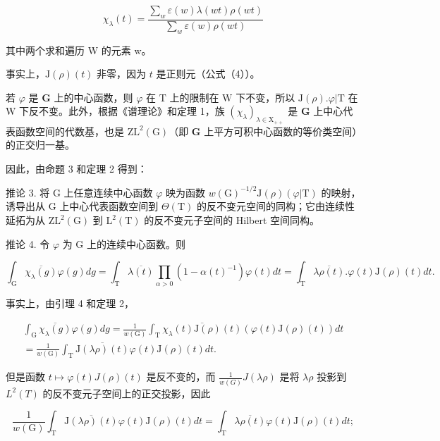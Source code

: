 \[
\chi_ {\lambda} (t) = \frac {\sum_ {w} \varepsilon (w) \lambda (w t) \rho (w t)}{\sum_ {w} \varepsilon (w) \rho (w t)}\tag{5}
\]

其中两个求和遍历 W 的元素 w。

事实上，\(\mathrm{J}(\rho)(t)\) 非零，因为 \(t\) 是正则元（公式（4））。

若 \(\varphi\) 是 \(\mathbf{G}\) 上的中心函数，则 \(\varphi\) 在 \(\mathrm{T}\) 上的限制在 \(\mathrm{W}\) 下不变，所以 \(\mathrm{J}(\rho). \varphi|\mathrm{T}\) 在 \(\mathrm{W}\) 下反不变。此外，根据《谱理论》和定理 1，族 \((\chi_{\lambda})_{\lambda \in \mathrm{X}_{++}}\) 是 \(\mathbf{G}\) 上中心代表函数空间的代数基，也是 \(\mathrm{ZL}^2(\mathrm{G})\)（即 \(\mathbf{G}\) 上平方可积中心函数的等价类空间）的正交归一基。

因此，由命题 3 和定理 2 得到：

推论 3. 将 G 上任意连续中心函数 \(\varphi\) 映为函数 \(w(\mathrm{G})^{-1/2}\mathrm{J}(\rho)(\varphi|\mathrm{T})\) 的映射，诱导出从 G 上中心代表函数空间到 \(\Theta(\mathrm{T})\) 的反不变元空间的同构；它由连续性延拓为从 \(\mathrm{ZL}^2(\mathrm{G})\) 到 \(\mathrm{L}^2(\mathrm{T})\) 的反不变元子空间的 Hilbert 空间同构。

推论 4. 令 \(\varphi\) 为 G 上的连续中心函数。则

\[
\int_ {\mathrm{G}} \overline {{\chi_ {\lambda} (g)}} \varphi (g) d g = \int_ {\mathrm{T}} \overline {{\lambda (t)}} \prod_ {\alpha > 0} (1 - \alpha (t) ^ {- 1}) \varphi (t) d t = \int_ {\mathrm{T}} \overline {{\lambda \rho (t)}}. \varphi (t) \mathrm{J} (\rho) (t) d t.
\]

事实上，由引理 4 和定理 2，

\[
\begin{array}{c} \int_ {\mathrm{G}} \overline {{\chi_ {\lambda} (g)}} \varphi (g) d g = \frac {1}{w (\mathrm{G})} \int_ {\mathrm{T}} \overline {{\chi_ {\lambda} (t) \mathrm{J} (\rho) (t)}} (\varphi (t) \mathrm{J} (\rho) (t)) d t \\ = \frac {1}{w (\mathrm{G})} \int_ {\mathrm{T}} \overline {{\mathrm{J} (\lambda \rho) (t)}} \varphi (t) \mathrm{J} (\rho) (t) d t. \end{array}
\]

但是函数 \(t \mapsto \varphi(t)J(\rho)(t)\) 是反不变的，而 \(\frac{1}{w(G)}J(\lambda\rho)\) 是将 \(\lambda\rho\) 投影到 \(L^{2}(T)\) 的反不变元子空间上的正交投影，因此

\[
\frac {1}{w (\mathrm{G})} \int_ {\mathrm{T}} \overline {{\mathrm{J} (\lambda \rho) (t)}} \varphi (t) \mathrm{J} (\rho) (t) d t = \int_ {\mathrm{T}} \overline {{\lambda \rho (t)}} \varphi (t) \mathrm{J} (\rho) (t) d t;
\]

